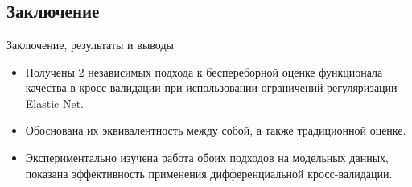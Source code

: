 \documentclass[unicode,lefteqn,c,hyperref={pdfpagelabels=false}]{beamer}
\begin{document}
\section*{}
\subsection{Заключение}
\begin{frame}{Заключение, результаты и выводы}
\begin{itemize}
	\item Получены 2 независимых подхода к беспереборной оценке функционала качества в кросс-валидации при использовании ограничений регуляризации Elastic Net.
	\item Обоснована их эквивалентность между собой, а также традиционной оценке.
	\item Экспериментально изучена работа обоих подходов на модельных 
	данных, показана эффективность применения дифференциальной кросс-валидации.
\end{itemize}
\end{frame}
\end{document}
